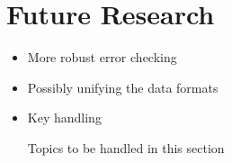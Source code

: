 \section{Future Research}

\begin{itemize}[ht!]
\item {More robust error checking}
\item {Possibly unifying the data formats}
\item {Key handling}
\caption{Topics to be handled in this section}
\end{itemize}